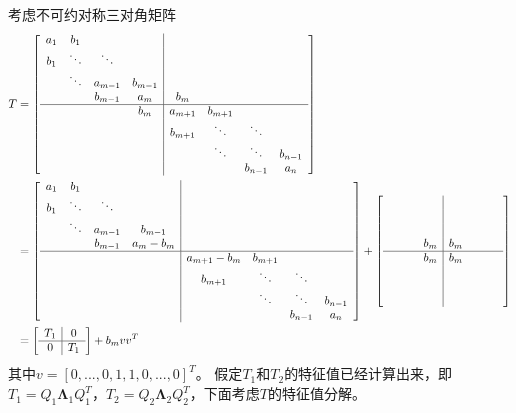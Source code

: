 \documentclass[12pt,a4paper]{article}
\begin{document}
考虑不可约对称三对角矩阵
$$\begin{aligned}
T&=\left[\begin{array}{cccc|cccc}
a_1&b_1&&&&&&\\
b_1&\ddots & \ddots &&&&&\\
&\ddots &a_{m-1}&b_{m-1}&&&&\\
&&b_{m-1}&a_m&b_m&&&\\
\hline
&&&b_m&a_{m+1}&b_{m+1}&&\\
&&&&b_{m+1}&\ddots&\ddots&\\
&&&&&\ddots&\ddots&b_{n-1}\\
&&&&&&b_{n-1}&a_n
\end{array}\right]\\
&=\left[\begin{array}{cccc|cccc}
a_1&b_1&&&&&&\\
b_1&\ddots & \ddots &&&&&\\
&\ddots &a_{m-1}&b_{m-1}&&&&\\
&&b_{m-1}&a_m-b_m&&&&\\
\hline
&&&&a_{m+1}-b_m&b_{m+1}&&\\
&&&&b_{m+1}&\ddots&\ddots&\\
&&&&&\ddots&\ddots&b_{n-1}\\
&&&&&&b_{n-1}&a_n
\end{array}\right]+\left[\begin{array}{cccc|cccc}
&&&&&&&\\&&&&&&&\\&&&&&&&\\&&&b_m&b_m&&&\\
\hline
&&&b_m&b_m&&&\\&&&&&&&\\&&&&&&&\\&&&&&&&
\end{array}\right]\\
&=\left[\begin{array}{c|c}
T_1&0\\\hline 0&T_1
\end{array}\right]+b_mvv^T
\end{aligned}
$$其中$v=[0,...,0,1,1,0,...,0]^T$。
假定$T_1$和$T_2$的特征值已经计算出来，即$T_1=Q_1\boldsymbol{\Lambda}_1Q_1^T$，$T_2=Q_2\boldsymbol{\Lambda}_2Q_2^T$，下面考虑$T$的特征值分解。
\end{document}
